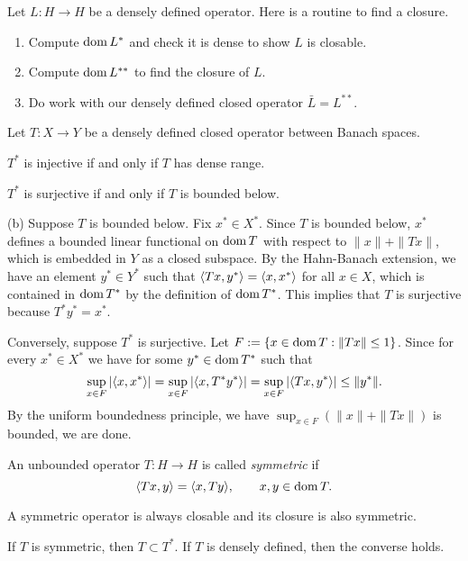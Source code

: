 \documentclass{../../large}
\begin{document}
Let $L:H\to H$ be a densely defined operator.
Here is a routine to find a closure.
\begin{enumerate}
\item Compute $\operatorname{dom} L^*$ and check it is dense to show $L$ is closable.
\item Compute $\operatorname{dom} L^{**}$ to find the closure of $L$.
\item Do work with our densely defined closed operator $\bar L=L^{**}$.
\end{enumerate}


\begin{prb}
Let $T:X\to Y$ be a densely defined closed operator between Banach spaces.
\begin{parts}
\item $T^*$ is injective if and only if $T$ has dense range.
\item $T^*$ is surjective if and only if $T$ is bounded below.
\end{parts}
\end{prb}
\begin{pf}
(b)
Suppose $T$ is bounded below.
Fix $x^*\in X^*$.
Since $T$ is bounded below, $x^*$ defines a bounded linear functional on $\operatorname{dom} T$ with respect to $\|x\|+\|Tx\|$, which is embedded in $Y$ as a closed subspace.
By the Hahn-Banach extension, we have an element $y^*\in Y^*$ such that $\langle Tx,y^*\rangle=\langle x,x^*\rangle$ for all $x\in X$, which is contained in $\operatorname{dom} T^*$ by the definition of $\operatorname{dom} T^*$.
This implies that $T$ is surjective because $T^*y^*=x^*$.

Conversely, suppose $T^*$ is surjective.
Let $F:=\{x\in\operatorname{dom} T:\|Tx\|\le1\}$.
Since for every $x^*\in X^*$ we have for some $y^*\in\operatorname{dom} T^*$ such that
\[\sup_{x\in F}|\langle x,x^*\rangle|=\sup_{x\in F}|\langle x,T^*y^*\rangle|=\sup_{x\in F}|\langle Tx,y^*\rangle|\le\|y^*\|.\]
By the uniform boundedness principle, we have $\sup_{x\in F}(\|x\|+\|Tx\|)$ is bounded, we are done.
\end{pf}

\begin{prb}
An unbounded operator $T:H\to H$ is called \emph{symmetric} if
\[\langle Tx,y\rangle=\langle x,Ty\rangle,\qquad x,y\in\operatorname{dom} T.\]
\begin{parts}
\item A symmetric operator is always closable and its closure is also symmetric.
\item If $T$ is symmetric, then $T\subset T^*$. If $T$ is densely defined, then the converse holds.
\end{parts}
\end{prb}
\end{document}
